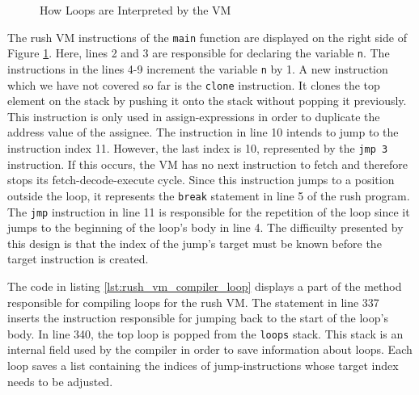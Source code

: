\noindent
\begin{figure}[h]
	\begin{minipage}{.5\textwidth}
		\centering
	\end{minipage}%
	\begin{minipage}{.5\textwidth}
		\centering
	\end{minipage}
	\caption{How Loops are Interpreted by the VM}
	\label{fig:vm_loops}
\end{figure}

The rush VM instructions of the \texttt{main} function are displayed on the right side of Figure \ref{fig:vm_loops}.
Here, lines 2 and 3 are responsible for declaring the variable \texttt{n}.
The instructions in the lines 4-9 increment the variable \texttt{n} by 1.
A new instruction which we have not covered so far is the \texttt{clone} instruction.
It clones the top element on the stack by pushing it onto the stack without popping it previously.
This instruction is only used in assign-expressions in order to duplicate the address value of the assignee.
The instruction in line 10 intends to jump to the instruction index 11.
However, the last index is 10, represented by the \texttt{jmp 3} instruction.
If this occurs, the VM has no next instruction to fetch and therefore stops its fetch-decode-execute cycle.
Since this instruction jumps to a position outside the loop, it represents the \texttt{break} statement in line 5 of the rush program.
The \texttt{jmp} instruction in line 11 is responsible for the repetition of the loop since it jumps to the beginning of the loop's body in line 4.
The difficuilty presented by this design is that the index of the jump's target must be known before the target instruction is created.


The code in listing \ref{lst:rush_vm_compiler_loop} displays a part of the method responsible for compiling loops for the rush VM.
The statement in line 337 inserts the instruction responsible for jumping back to the start of the loop's body.
In line 340, the top loop is popped from the \texttt{loops} stack.
This stack is an internal field used by the compiler in order to save information about loops.
Each loop saves a list containing the indices of jump-instructions whose target index needs to be adjusted.

